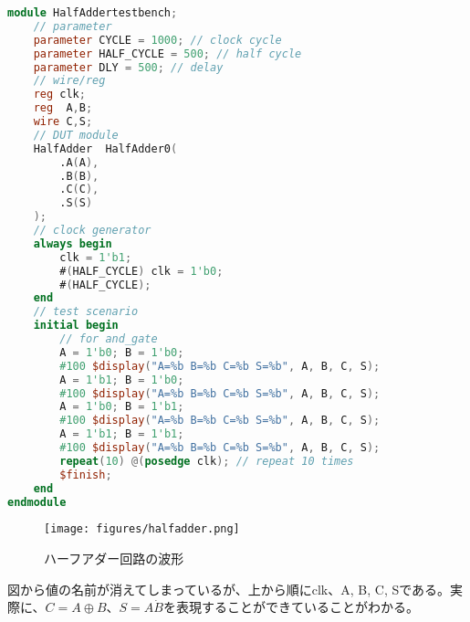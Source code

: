 \documentclass[titlepage]{ltjsarticle}
\begin{document}
\begin{lstlisting}[caption=ハーフアダーテストベンチ,language=verilog]
    module HalfAddertestbench;
    // parameter
    parameter CYCLE = 1000; // clock cycle
    parameter HALF_CYCLE = 500; // half cycle
    parameter DLY = 500; // delay
    // wire/reg
    reg clk;
    reg  A,B;
    wire C,S;
    // DUT module
    HalfAdder  HalfAdder0(
        .A(A),
        .B(B),
        .C(C),
        .S(S)
    );    
    // clock generator
    always begin
        clk = 1'b1;
        #(HALF_CYCLE) clk = 1'b0;
        #(HALF_CYCLE);
    end
    // test scenario
    initial begin
        // for and_gate
        A = 1'b0; B = 1'b0;
        #100 $display("A=%b B=%b C=%b S=%b", A, B, C, S);
        A = 1'b1; B = 1'b0;
        #100 $display("A=%b B=%b C=%b S=%b", A, B, C, S); 
        A = 1'b0; B = 1'b1;
        #100 $display("A=%b B=%b C=%b S=%b", A, B, C, S);  
        A = 1'b1; B = 1'b1;
        #100 $display("A=%b B=%b C=%b S=%b", A, B, C, S);
        repeat(10) @(posedge clk); // repeat 10 times
        $finish;
    end
endmodule
\end{lstlisting}
\begin{figure}[H]
    \begin{center}
        \texttt{[image: figures/halfadder.png]}
        \caption{ハーフアダー回路の波形}
    \end{center}
\end{figure}
図から値の名前が消えてしまっているが、上から順にclk、A, B, C, Sである。実際に、$C=A\oplus B$、$S=A\dot B$を表現することができていることがわかる。
\end{document}
